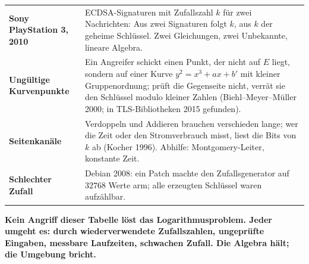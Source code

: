 \begin{warnung}
\begin{center}
{\small
\renewcommand{\arraystretch}{1.5}
\begin{tabular}{@{}P{3.0cm}P{5.8cm}@{}}
\toprule
\textbf{Sony PlayStation 3, 2010} & ECDSA-Signaturen mit  Zufallszahl $k$ für zwei Nachrichten: Aus zwei Signaturen folgt $k$, aus $k$ der geheime Schlüssel. Zwei Gleichungen, zwei Unbekannte, lineare Algebra.\\
\textbf{Ungültige Kurvenpunkte} & Ein Angreifer schickt einen Punkt, der nicht auf $E$ liegt, sondern auf einer Kurve $y^{2} = x^{3} + ax + b'$ mit kleiner Gruppenordnung; prüft die Gegenseite nicht, verrät sie den Schlüssel modulo kleiner Zahlen (Biehl--Meyer--Müller 2000; in TLS-Bibliotheken 2015 gefunden).\\
\textbf{Seitenkanäle} & Verdoppeln und Addieren brauchen verschieden lange; wer die Zeit oder den Stromverbrauch misst, liest die Bits von $k$ ab (Kocher 1996). Abhilfe: Montgomery-Leiter, konstante Zeit.\\
\textbf{Schlechter Zufall} & Debian 2008: ein Patch machte den Zufallsgenerator auf $32768$ Werte arm; alle erzeugten Schlüssel waren aufzählbar.\\
\bottomrule
\end{tabular}}
\end{center}

\begin{center}
\begin{minipage}{0.9\textwidth}
\textbf{Kein Angriff dieser Tabelle löst das Logarithmusproblem. Jeder umgeht es: durch wiederverwendete Zufallszahlen, ungeprüfte Eingaben, messbare Laufzeiten, schwachen Zufall. Die Algebra hält; die Umgebung bricht.}
\end{minipage}
\end{center}

\begin{center}
\begin{minipage}{0.88\textwidth}
\end{minipage}
\end{center}
\end{warnung}


